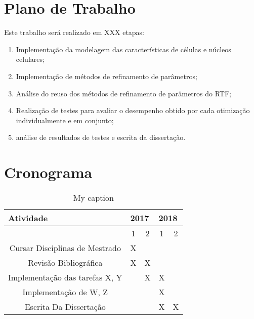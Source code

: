 \documentclass[a4paper,10pt]{article}
\begin{document}
\section{Plano de Trabalho}

Este trabalho será realizado em XXX etapas:
\begin{enumerate}
	\item Implementação da modelagem das características de células e núcleos celulares;
	\item Implementação de métodos de refinamento de parâmetros;
	\item Análise do reuso dos métodos de refinamento de parâmetros do RTF;
	\item Realização de testes para avaliar o desempenho obtido por cada otimização individualmente e em conjunto;
	\item análise de resultados de testes e escrita da dissertação.
\end{enumerate}


\section{Cronograma}
\begin{table}[]
	\centering
	\caption{My caption}
	\label{my-label}
	\begin{tabular}{|c|c|c|c|c|}
		\hline
		\multicolumn{1}{|l|}{Atividade} & \multicolumn{2}{l|}{2017} & \multicolumn{2}{l|}{2018} \\ \hline
		& 1\degree    & 2\degree    & 1\degree    & 2\degree    \\ \hline
		Cursar Disciplinas de Mestrado  & X           &             &             &             \\ \hline
		Revisão Bibliográfica           & X           & X           &             &             \\ \hline
		Implementação das tarefas X, Y  &             & X           & X           &             \\ \hline
		Implementação de W, Z     &             &             & X           &             \\ \hline
		Escrita Da Dissertação          &             &             & X           & X           \\ \hline
	\end{tabular}
\end{table}



	
	
	
\end{document}
